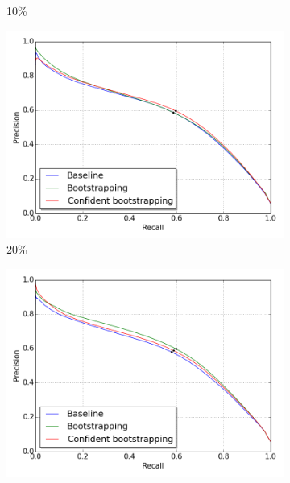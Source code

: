 \begin{figure}[H]
\begin{subfigure}{0.31\textwidth}
\caption{10\% } \label{fig:app_E2_1_pr}
\vspace{-0.1cm} %
\end{subfigure}
\hspace*{\fill} %
\begin{subfigure}{0.31\textwidth}
\includegraphics[width=\textwidth]{figs/E2/pr_2.png}
\caption{20\% } \label{fig:app_E2_2_pr}
\vspace{-0.1cm} %
\end{subfigure}
\begin{subfigure}{0.31\textwidth}
\includegraphics[width=\textwidth]{figs/E2/pr_3.png}

\end{subfigure}
\end{figure}
